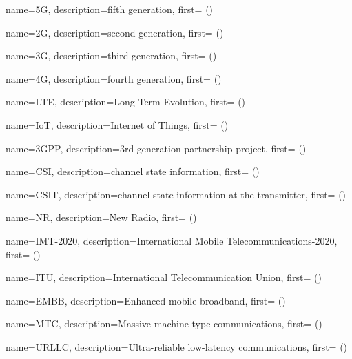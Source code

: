 {
  name={5G},
  description={fifth generation},
  first={ ()}
}


{
  name={2G},
  description={second generation},
  first={ ()}
}


{
  name={3G},
  description={third generation},
  first={ ()}
}

{
  name={4G},
  description={fourth generation},
  first={ ()}
}

{
  name={LTE},
  description={Long-Term Evolution},
  first={ ()}
}

{
  name={IoT},
  description={Internet of Things},
  first={ ()}
}

{
  name={3GPP},
  description={3rd generation partnership project},
  first={ ()}
}


{
  name={CSI},
  description={channel state information},
  first={ ()}
}

{
  name={CSIT},
  description={channel state information at the transmitter},
  first={ ()}
}

{
  name={NR},
  description={New Radio},
  first={ ()}
}


{
  name={IMT-2020},
  description={International Mobile Telecommunications-2020},
  first={ ()}
}

{
  name={ITU},
  description={International Telecommunication Union},
  first={ ()}
}

{
  name={EMBB},
  description={Enhanced mobile broadband},
  first={ ()}
}

{
  name={MTC},
  description={Massive machine-type communications},
  first={ ()}
}


{
  name={URLLC},
  description={Ultra-reliable low-latency communications},
  first={ ()}
}


